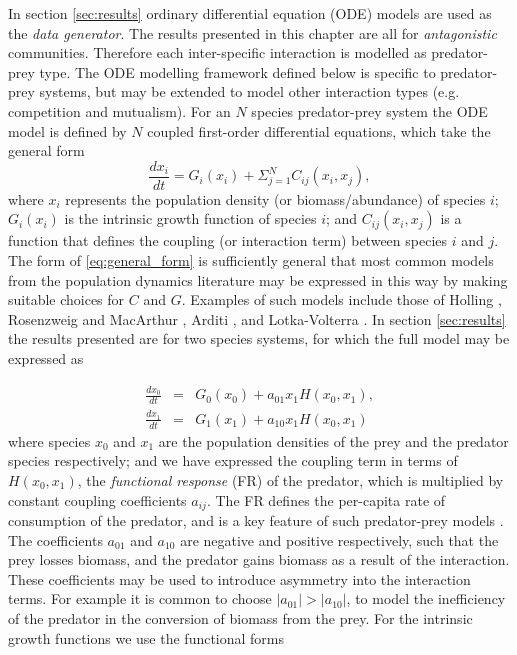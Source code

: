 In section \ref{sec:results} ordinary differential equation (ODE) models are used as the \emph{data generator}.  The results presented in this chapter are all for \emph{antagonistic} communities. Therefore each inter-specific interaction is modelled as predator-prey type. The ODE modelling framework defined below is specific to predator-prey systems, but may be extended  to model other interaction types (e.g. competition and mutualism). For an $N$ species predator-prey system the ODE model is defined by $N$ coupled first-order differential equations, which take the general form
\begin{equation}
\frac{dx_i}{dt} = G_i(x_i) + \Sigma_{j=1}^N C_{ij}(x_i,x_j),
\label{eq:general_form}
\end{equation}
%
where $x_i$ represents the population density (or biomass/abundance) of species $i$; $G_i(x_i)$ is the intrinsic growth function of species $i$; and $C_{ij}(x_i,x_j)$ is a function that defines the coupling (or interaction term) between species $i$ and $j$. The form of \eqref{eq:general_form} is sufficiently general that most common models from the population dynamics literature may be expressed in this way by making suitable choices for $C$ and $G$. Examples of such models include those of Holling \cite{holling1959some}, Rosenzweig and MacArthur \cite{rosenzweig1963graphical}, Arditi \cite{arditi2012species}, and Lotka-Volterra \cite{volterra1926,lotka1925elements}. In section \ref{sec:results} the results presented are for two species systems, for which the full model may be expressed as

\begin{eqnarray}
\frac{dx_0}{dt} &=& G_{0}(x_0) + a_{01}x_1H(x_0,x_1),  \nonumber \\[10pt]
\frac{dx_1}{dt} &=& G_{1}(x_1) + a_{10}x_1H(x_0,x_1)
\label{eq:two_species}
\end{eqnarray}
%
where species $x_0$ and $x_1$ are the population densities of the prey and the predator species respectively; and we have expressed the coupling term in terms of $H(x_0,x_1)$, the \emph{functional response} (FR) of the predator, which is multiplied by constant coupling coefficients $a_{ij}$. The FR defines the per-capita rate of consumption of the predator, and is a key feature of such predator-prey models \cite{barraquand2014functional,jost2000identifying}. The coefficients $a_{01}$ and $a_{10}$ are negative and positive respectively, such that the prey losses biomass, and the predator gains biomass as a result of the interaction. These coefficients may be used to introduce asymmetry into the interaction terms. For example it is common to choose $|a_{01}| > |a_{10}|$, to model the inefficiency of the predator in the conversion of biomass from the prey. For the intrinsic growth functions we use the functional forms  

